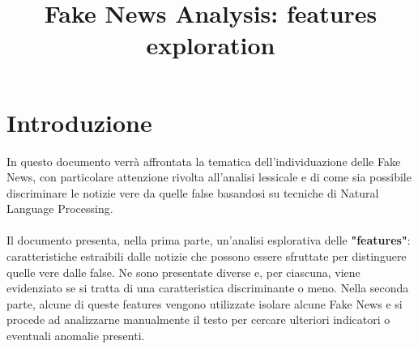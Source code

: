 \documentclass{article}
\title{Fake News Analysis: features exploration}
\begin{document}
	\maketitle   
	 
    \newpage
    	
   	\section{Introduzione}
    	In questo documento verrà affrontata la tematica dell'individuazione delle Fake News, con particolare attenzione rivolta all'analisi lessicale e di come sia possibile discriminare le notizie vere da quelle false basandosi su tecniche di Natural Language Processing.
	    \\~\\
	    Il documento presenta, nella prima parte, un'analisi esplorativa delle \textbf{"features"}: caratteristiche estraibili dalle notizie che possono essere sfruttate per distinguere quelle vere dalle false. Ne sono presentate diverse e, per ciascuna, viene evidenziato se si tratta di una caratteristica discriminante o meno.
	    Nella seconda parte, alcune di queste features vengono utilizzate isolare alcune Fake News e si procede ad analizzarne manualmente il testo per cercare ulteriori indicatori o eventuali anomalie presenti.
	    
	    \newpage
	    
\end{document}

